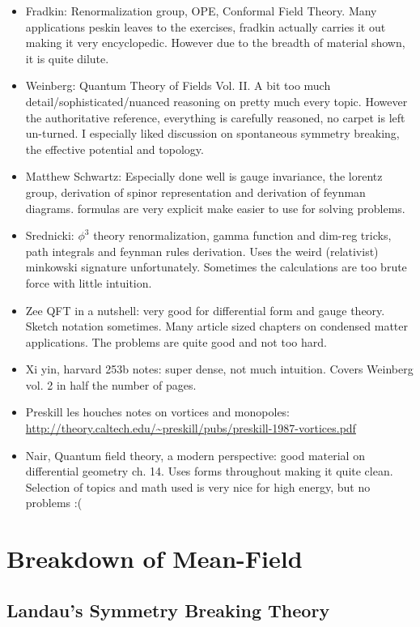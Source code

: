 \documentclass[11pt]{scrartcl}
\begin{document}
\begin{itemize}
	\item Fradkin: Renormalization group, OPE, Conformal Field Theory. Many applications peskin leaves to the exercises, fradkin actually carries it out making it very encyclopedic.  However due to the breadth of material shown, it is quite dilute.
	\item Weinberg: Quantum Theory of Fields Vol. II.  A bit too much detail/sophisticated/nuanced reasoning on pretty much every topic.  However the authoritative reference, everything is carefully reasoned, no carpet is left un-turned.   I especially liked discussion on spontaneous symmetry breaking, the effective potential and topology.
	\item Matthew Schwartz:  Especially done well is gauge invariance, the lorentz group, derivation of spinor representation and derivation of feynman diagrams.  formulas are very explicit make easier to use for solving problems.
	\item Srednicki: $\phi^3$ theory renormalization, gamma function and dim-reg tricks, path integrals and feynman rules derivation.  Uses the weird (relativist) minkowski signature unfortunately.  Sometimes the calculations are too brute force with little intuition.
	\item Zee QFT in a nutshell: very good for differential form and gauge theory. Sketch notation sometimes.  Many article sized chapters on condensed matter applications.  The problems are quite good and not too hard.
	\item Xi yin, harvard 253b notes:  super dense, not much intuition.  Covers Weinberg vol. 2 in half the number of pages.
	\item Preskill les houches notes on vortices and monopoles: \url{http://theory.caltech.edu/~preskill/pubs/preskill-1987-vortices.pdf}
	\item Nair, Quantum field theory, a modern perspective: good material on differential geometry ch. 14.  Uses forms throughout making it quite clean.  Selection of topics and math used is very nice for high energy, but no problems :(
\end{itemize}


\section{Breakdown of Mean-Field}

\subsection{Landau's Symmetry Breaking Theory}
\end{document}
